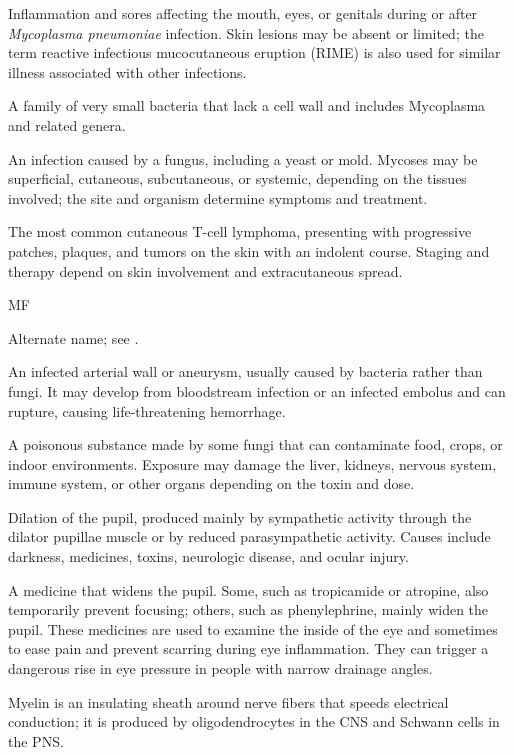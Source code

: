  Inflammation and sores affecting the mouth, eyes, or genitals during or after \textit{Mycoplasma pneumoniae} infection. Skin lesions may be absent or limited; the term reactive infectious mucocutaneous eruption (RIME) is also used for similar illness associated with other infections.

 A family of very small bacteria that lack a cell wall and includes Mycoplasma and related genera.


 An infection caused by a fungus, including a yeast or mold. Mycoses may be superficial, cutaneous, subcutaneous, or systemic, depending on the tissues involved; the site and organism determine symptoms and treatment.

 The most common cutaneous T-cell lymphoma, presenting with progressive patches, plaques,
and tumors on the skin with an indolent course. Staging and therapy depend on skin
involvement and extracutaneous spread.

\synonyms
MF

 Alternate name; see .

 An infected arterial wall or aneurysm, usually caused by bacteria rather than fungi. It may develop from bloodstream infection or an infected embolus and can rupture, causing life-threatening hemorrhage.

 A poisonous substance made by some fungi that can contaminate food, crops, or indoor environments. Exposure may damage the liver, kidneys, nervous system, immune system, or other organs depending on the toxin and dose.

 Dilation of the pupil, produced mainly by sympathetic activity through the dilator pupillae muscle or by
reduced parasympathetic activity. Causes include darkness, medicines, toxins, neurologic
disease, and ocular injury.

 A medicine that widens the pupil. Some, such as tropicamide or atropine, also temporarily prevent focusing; others, such as phenylephrine, mainly widen the pupil. These medicines are used to examine the inside of the eye and sometimes to ease pain and prevent scarring during eye inflammation. They can trigger a dangerous rise in eye pressure in people with narrow drainage angles.

 Myelin is an insulating sheath around nerve fibers that speeds electrical conduction; it is produced by oligodendrocytes in the CNS and Schwann cells in the PNS.

